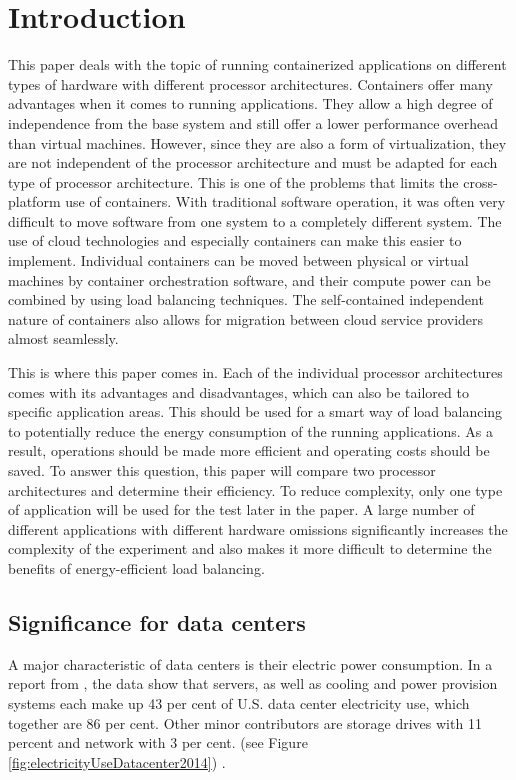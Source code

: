 \section{Introduction}
This paper deals with the topic of running containerized applications on
different types of hardware with different processor architectures.  Containers
offer many advantages when it comes to running applications. They allow a high
degree of independence from the base system and still offer a lower performance
overhead than virtual machines. However, since they are also a form of
virtualization, they are not independent of the processor architecture and must
be adapted for each type of processor architecture. This is one of the problems
that limits the cross-platform use of containers.  With traditional software
operation, it was often very difficult to move software from one system to a
completely different system. The use of cloud technologies and especially
containers can make this easier to implement. Individual containers can be
moved between physical or virtual machines by container orchestration software,
and their compute power can be combined by using load balancing techniques.
The self-contained independent nature of containers also allows for migration
between cloud service providers almost seamlessly.

This is where this paper comes in. Each of the individual processor
architectures comes with its advantages and disadvantages, which can also be
tailored to specific application areas. This should be used for a smart way of
load balancing to potentially reduce the energy consumption of the running
applications. As a result, operations should be made more efficient and
operating costs should be saved.  To answer this question, this paper will
compare two processor architectures and determine their efficiency. To reduce
complexity, only one type of application will be used for the test later in the
paper. A large number of different applications with different hardware
omissions significantly increases the complexity of the experiment and also
makes it more difficult to determine the benefits of energy-efficient load
balancing.

\subsection{Significance for data centers}
A major characteristic of data centers is their
electric power consumption.
In a report from \citeauthor{shehabi2016united}, 
the data show that servers, as well as 
cooling and power provision systems each
make up 43 per cent of U.S. data center electricity use,
which together are 86 per cent. Other minor contributors
are storage drives with 11 percent and network with 3 per cent.
(see Figure \ref{fig:electricityUseDatacenter2014})
\cite{shehabi2016united}.

